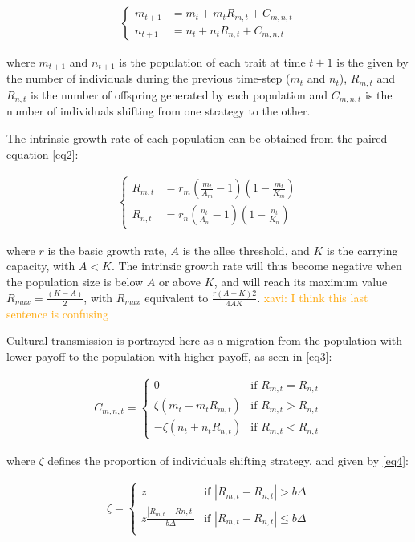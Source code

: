 \documentclass[preprint,authoryear]{elsarticle}
\newcommand{\memo}[2]{\textcolor{#1}{#2}}
\newcommand{\xavi}[1]{\memo{orange}{xavi: #1\\}}
\begin{document}
\begin{align}
\label{eq1}
\begin{cases}
m_{t+1}& = m_t + m_t R_{m,t} + C_{m,n,t} \\
n_{t+1}& = n_t + n_t R_{n,t} + C_{m,n,t}
\end{cases}
\end{align}

where $m_{t+1}$ and $n_{t+1}$ is the population of each trait at time $t+1$ is the given by the number of individuals during the previous time-step ($m_t$ and $n_t$), $R_{m,t}$ and $R_{n,t}$ is the number of offspring generated by each population and $C_{m,n,t}$ is the number of individuals shifting from one strategy to the other.

The intrinsic growth rate of each population can be obtained from the paired equation \eqref{eq2}:

\begin{align}
\label{eq2}
\begin{cases}
R_{m,t}& = r_m (\frac{m_t}{A_m}-1)(1-\frac{m_t}{K_m})\\
R_{n,t}& = r_n (\frac{n_t}{A_n}-1)(1-\frac{n_t}{K_n})
\end{cases}
\end{align}

where $r$ is the basic growth rate, $A$ is the allee threshold, and $K$ is the carrying capacity, with $A < K$.  The intrinsic growth rate will thus become negative when the population size is below $A$ or above $K$, and will reach its maximum value $R_{max} = \frac{(K-A)}{2}$, with $R_{max}$ equivalent to $\frac{r(A-K)2}{4AK}$. 
\xavi{I think this last sentence is confusing}

Cultural transmission is portrayed here as a migration from the population with lower payoff to the population with higher payoff, as seen in \eqref{eq3}:

\begin{align}
\label{eq3}
C_{m,n,t} = 
\begin{cases}
0& \text{if } R_{m,t} = R_{n,t}\\
\zeta(m_t+m_tR_{m,t})& \text{if } R_{m,t} > R_{n,t}\\
-\zeta(n_t+n_tR_{n,t})& \text{if } R_{m,t} < R_{n,t}
\end{cases}
\end{align}

where $\zeta$ defines the proportion of individuals shifting strategy, and given by \eqref{eq4}:

\begin{align}
\label{eq4}
\zeta = 
\begin{cases}
z& \text{if }|R_{m,t}-R_{n,t}| > b\Delta\\
z\frac{|R_{m,t}-R{n,t}|}{b\Delta}& \text{if }|R_{m,t}-R_{n,t}| \leq b\Delta\\
\end{cases}
\end{align}
\end{document}

